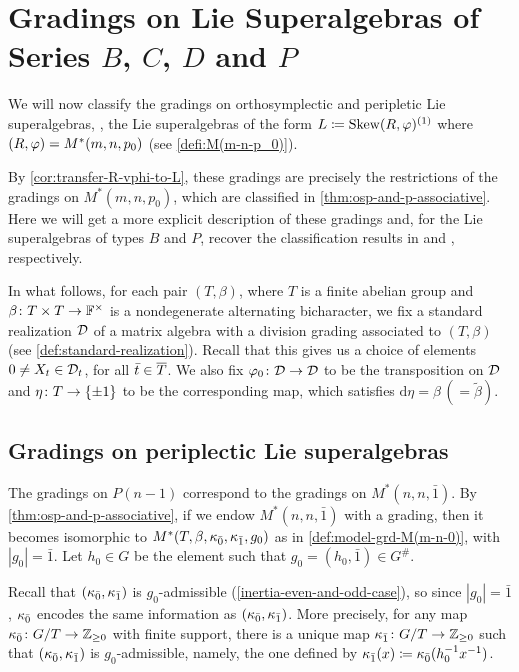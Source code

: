 
\section[Gradings on Lie Superalgebras of Series \texorpdfstring{$B$, $C$, $D$ and $P$}{B, C, D and P}]{Gradings on Lie Superalgebras of Series $B$, $C$, $D$ and $P$}\label{sec:grds-osp-and-p}

We will now classify the gradings on orthosymplectic and peripletic Lie superalgebras, \ie, the Lie superalgebras of the form $L \coloneqq \operatorname{Skew}(R, \varphi)^{(1)}$ where $(R, \varphi) = M^*(m,n, p_0)$ (see \cref{defi:M(m-n-p_0)}). 

By \cref{cor:transfer-R-vphi-to-L}, these gradings are precisely the restrictions of the gradings on $M^*(m,n, p_0)$, which are classified in \cref{thm:osp-and-p-associative}. 
Here we will get a more explicit description of these gradings and, for the Lie superalgebras of types $B$ and $P$, recover the classification results in \cite{Helens_thesis} and \cite{paper-MAP}, respectively. 

In what follows, for each pair $(T, \beta)$, where $T$ is a finite abelian group and $\beta\colon {T\times T} \to \mathbb{F}^\times$ is a nondegenerate alternating bicharacter, we fix a standard realization $\mathcal{D}$ of a matrix algebra with a division grading associated to $(T, \beta)$ (see \cref{def:standard-realization}). 
Recall that this gives us a choice of elements $0 \neq X_{ t} \in \mathcal{D}_{t}$, for all $\bar t \in \barr T$. 
We also fix $\varphi_0\colon \mathcal{D} \to \mathcal{D}$ to be the transposition on $\mathcal{D}$ and $\eta\colon T \to \{\pm 1\}$ to be the corresponding map, which satisfies $\mathrm{d}\eta = \beta \, (= \tilde\beta)$. 

\subsection{Gradings on periplectic Lie superalgebras}\label{ssec:grds-P(n)}

The gradings on $P(n-1)$ correspond to the gradings on $M^*(n, n, \bar 1)$. 
By \cref{thm:osp-and-p-associative}, if we endow $M^*(n, n, \bar 1)$ with a grading, then it becomes isomorphic to $M^*(T, \beta, \kappa_{\bar{0}}, \kappa_{\bar{1}}, g_0)$ as in \cref{def:model-grd-M(m-n-0)}, with $|g_0| = \bar 1$. 
Let $h_0 \in G$ be the element such that $g_0 = (h_0, \bar 1) \in G^\#$. 

Recall that $(\kappa_{\bar{0}}, \kappa_{\bar{1}})$ is $g_0$-admissible (\cref{inertia-even-and-odd-case}), so since $|g_0| = \bar 1$, $\kappa_{\bar{0}}$ encodes the same information as $(\kappa_{\bar{0}}, \kappa_{\bar{1}})$. 
More precisely, for any map $\kappa_{\bar{0}}\colon G/T \to \mathbb{Z}_{\geq 0}$ with finite support, there is a unique map $\kappa_{\bar{1}}\colon G/T \to \mathbb{Z}_{\geq 0}$ such that $(\kappa_{\bar{0}}, \kappa_{\bar{1}})$ is $g_0$-admissible, namely, the one defined by $\kappa_{\bar{1}} (x) \coloneqq \kappa_{\bar{0}} (h_0^{-1} x^{-1})$. 

